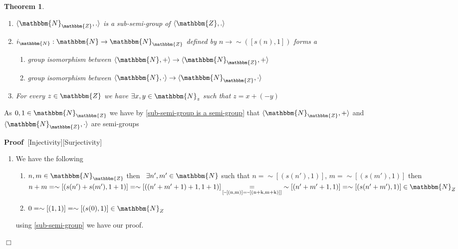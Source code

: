 \documentclass{book}
\newcommand{\equallim}{\mathop{=}\limits}
\newcommand{\um}{-}
\newcommand{\upl}{+}
\newenvironment{proof}{\noindent\textbf{Proof\ }}{\hspace*{\fill}$\Box$\medskip}
\newtheorem{theorem}{Theorem}
\begin{document}
{{\begin{theorem}
\begin{enumerate}
    \item $\langle \mathbbm{N}_{\mathbbm{Z}}, . \rangle$ is a sub-semi-group
    of $\langle \mathbbm{Z}, . \rangle$
    
    \item $i_{\mathbbm{N}} : \mathbbm{N} \rightarrow
    \mathbbm{N}_{\mathbbm{Z}}$ defined by $n \rightarrow \sim ([s (n), 1])$
    forms a
    \begin{enumerate}
      \item group isomorphism between $\langle \mathbbm{N}, + \rangle
      \rightarrow \langle \mathbbm{N}_{\mathbbm{Z}}, + \rangle$
      
      \item group isomorphism between $\langle \mathbbm{N}, \cdot \rangle
      \rightarrow \langle \mathbbm{N}_{\mathbbm{Z}}, \cdot \rangle$
    \end{enumerate}
    \item For every $z \in \mathbbm{Z}$ we have $\exists x, y \in
    \mathbbm{N}_z$ such that $z = x \upl (\um y)$
  \end{enumerate}
\end{theorem}

As $0, 1 \in \mathbbm{N}_{\mathbbm{Z}}$ we have by \ref{sub-semi-group is a
semi-group} that $\langle \mathbbm{N}_{\mathbbm{Z}}, + \rangle$ and $\langle
\mathbbm{N}_{\mathbbm{Z}}, \cdot \rangle$ are semi-groups

\begin{proof}[Injectivity][Surjectivity]
  
  \begin{enumerate}
    \item We have the following
    \begin{enumerate}
      \item $n, m \in \mathbbm{N}_{\mathbbm{Z}}$ then \ $\exists n', m' \in
      \mathbbm{N}$ such that $n = \sim [(s (n'), 1)]$, $m = \sim [(s (m'),
      1)]$ then $n \upl m = \sim [(s (n') \upl s (m'), 1 \upl 1)] = \sim [((n'
      \upl m' \upl 1) \upl 1, 1 \upl 1)]
      \equallim_{\text{\ref{~[(n,m)]=~[(n+k,m+k)]}}} \sim [(n' \upl m' \upl 1,
      1)] = \sim [(s (n' \upl m'), 1)] \in \mathbbm{N}_Z$
      
      \item $0 = \sim [(1, 1)] = \sim [(s (0), 1)] \in \mathbbm{N}_Z$
    \end{enumerate}
    using \ref{sub-semi-group} we have our proof.
    

\end{enumerate}
\end{proof}}}
\end{document}
